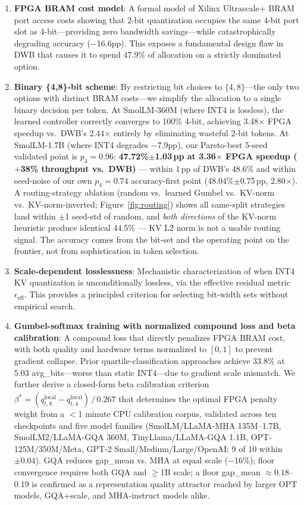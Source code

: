 \documentclass{article}
\begin{document}
\begin{enumerate}
\item \textbf{FPGA BRAM cost model}: A formal model of Xilinx Ultrascale+ BRAM port access costs showing that 2-bit quantization occupies the same 4-bit port slot as 4-bit---providing zero bandwidth savings---while catastrophically degrading accuracy ($-$16.6pp). This exposes a fundamental design flaw in DWB that causes it to spend 47.9\% of allocation on a strictly dominated option.

\item \textbf{Binary \{4,8\}-bit scheme}: By restricting bit choices to $\{4, 8\}$---the only two options with distinct BRAM costs---we simplify the allocation to a single binary decision per token. At SmolLM-360M (where INT4 is lossless), the learned controller correctly converges to 100\% 4-bit, achieving 3.48$\times$ FPGA speedup vs.\ DWB's 2.44$\times$ entirely by eliminating wasteful 2-bit tokens. At SmolLM-1.7B (where INT4 degrades $-$7.9pp), our Pareto-best 5-seed validated point is $p_4{=}0.96$: \textbf{47.72\%$\pm$1.03\,pp at 3.36$\times$ FPGA speedup (\mbox{$+$38\%} throughput vs.\ DWB)} --- within 1\,pp of DWB's 48.6\% and within seed-noise of our own $p_4{=}0.74$ accuracy-first point (48.04\%$\pm$0.75\,pp, 2.80$\times$). A routing-strategy ablation (random vs.\ learned Gumbel vs.\ KV-norm vs.\ KV-norm-inverted; Figure~\ref{fig:routing}) shows all same-split strategies land within $\pm$1 seed-std of random, and \emph{both directions} of the KV-norm heuristic produce identical 44.5\% --- KV L2 norm is not a usable routing signal. The accuracy comes from the bit-set and the operating point on the frontier, not from sophistication in token selection.

\item \textbf{Scale-dependent losslessness}: Mechanistic characterization of when INT4 KV quantization is unconditionally lossless, via the effective residual metric $\epsilon_\text{eff}$. This provides a principled criterion for selecting bit-width sets without empirical search.

\item \textbf{Gumbel-softmax training with normalized compound loss and beta calibration}: A compound loss that directly penalizes FPGA BRAM cost, with both quality and hardware terms normalized to $[0,1]$ to prevent gradient collapse. Prior quartile-classification approaches achieve 33.8\% at 5.03 avg\_bits---worse than static INT4---due to gradient scale mismatch. We further derive a closed-form beta calibration criterion $\beta^* = \overline{(q_{t,8}^\text{local} - q_{t,4}^\text{local})}\,/\,0.267$ that determines the optimal FPGA penalty weight from a $<$1 minute CPU calibration corpus, validated across ten checkpoints and five model families (SmolLM/LLaMA-MHA 135M--1.7B, SmolLM2/LLaMA-GQA 360M, TinyLlama/LLaMA-GQA 1.1B, OPT-125M/350M/Meta, GPT-2 Small/Medium/Large/OpenAI; 9 of 10 within $\pm 0.04$). GQA reduces gap\_mean vs. MHA at equal scale ($-$16\%); floor convergence requires both GQA and $\geq$1B scale; a floor gap\_mean $\approx 0.18$--$0.19$ is confirmed as a representation quality attractor reached by larger OPT models, GQA+scale, and MHA-instruct models alike.
\end{enumerate}
\end{document}
